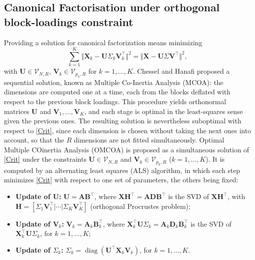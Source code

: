 \documentclass[11pt]{article}
\DeclareMathOperator{\diag}{diag}
\newcommand{\X}{\mathbf{X}}
\newcommand{\U}{\mathbf{U}}
\newcommand{\V}{\mathbf{V}}
\newcommand{\Stiefel}[2]{\mathcal V_{#1,#2}}
\begin{document}

\subsection{Canonical Factorisation under orthogonal block-loadings constraint}

Providing a solution for canonical factorization means minimizing
\begin{equation}
	\sum_{k=1}^K\Vert \X_k - \U\Sigma_k \V_k^\intercal\Vert^2= \Vert \X- \U \Sigma \V^\intercal\Vert^2, \label{Crit}
\end{equation}
with $\U\in\Stiefel{N}{R}$, $\V_k\in\Stiefel{p_k}{R}$ for $k=1,\ldots,K$. 
Chessel and Hanafi \cite{chessel1996} proposed a sequential solution, known as Multiple Co-Inertia Analysis (MCOA): the dimensions are computed one at a time, each from the blocks deflated with respect to the previous block loadings. This procedure yields orthonormal matrices $\U$ and $\V_1,\ldots,\V_K$, and each stage is optimal in the
least-squares sense given the previous ones. The resulting solution is nevertheless suboptimal with respect to \eqref{Crit}, since each dimension is chosen without taking the next ones into account, so that the $R$ dimensions are not fitted simultaneously.
Optimal Multiple COinertia Analysis (OMCOA) is proposed as a simultaneous solution of \eqref{Crit} under the constraints $\U\in \Stiefel{N}{R}$ and $\V_k\in \Stiefel{p_k}{R}$ ($k=1,\ldots,K$). It is computed by an alternating least squares (ALS) algorithm, in which each step minimizes \eqref{Crit} with respect to one set of parameters, the others being fixed:
\begin{itemize}
  \item \textbf{Update of $\U$:} $\U=\mathbf A\mathbf B^\intercal$, where $\X\mathbf H^\intercal=\mathbf A\mathbf D\mathbf B^\intercal$ is the SVD of
        $\X\mathbf H^\intercal$, with $\mathbf H=[\Sigma_1\V_1^\intercal|\cdots|\Sigma_K\V_K^\intercal]$ (orthogonal Procrustes problem);
  \item \textbf{Update of $\V_k$:} $\V_k=\mathbf A_k\mathbf B_k^\intercal$, where $\X_k^\intercal\U\Sigma_k=\mathbf A_k\mathbf D_k\mathbf B_k^\intercal$
        is the SVD of $\X_k^\intercal\U\Sigma_k$, for $k=1,\ldots,K$;
  \item \textbf{Update of $\Sigma_k$:} $\Sigma_k=\diag(\U^\intercal\X_k\V_k)$, for $k=1,\ldots,K$.
\end{itemize}
\end{document}

